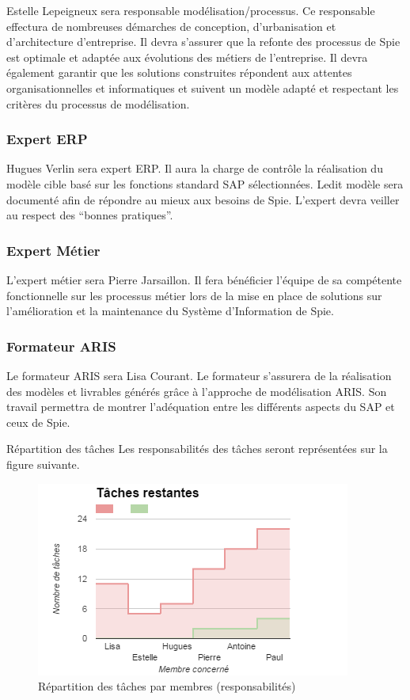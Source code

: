 Estelle Lepeigneux sera responsable modélisation/processus. Ce responsable effectura de nombreuses démarches de conception, d’urbanisation et d’architecture d’entreprise. Il devra s’assurer que la refonte des processus de Spie est optimale et adaptée aux évolutions des métiers de l’entreprise. Il devra également garantir que les solutions construites répondent aux attentes organisationnelles et informatiques et suivent un modèle adapté et respectant les critères du processus de modélisation.

\subsubsection{Expert ERP}

Hugues Verlin sera expert ERP. Il aura la charge de contrôle la réalisation du modèle cible basé sur les fonctions standard SAP sélectionnées. Ledit modèle sera documenté afin de répondre au mieux aux besoins de Spie. L’expert devra veiller au respect des “bonnes pratiques”.

\subsubsection{Expert Métier}

L’expert métier sera Pierre Jarsaillon. Il fera bénéficier l’équipe de sa compétente fonctionnelle sur les processus métier lors de la mise en place de solutions sur l’amélioration et la maintenance du Système d’Information de Spie.

\subsubsection{Formateur ARIS}

Le formateur ARIS sera Lisa Courant. Le formateur s’assurera de la réalisation des modèles et livrables générés grâce à l’approche de modélisation ARIS. Son travail permettra de montrer l'adéquation entre les différents aspects du SAP et ceux de Spie.

Répartition des tâches
    Les responsabilités des tâches seront représentées sur la figure suivante.
    
\begin{figure}[H]
    \centering
    \label{fig-taches}
    \includegraphics[scale=0.6]{figures/taches_restantes.png}
    \caption{Répartition des tâches par membres (responsabilités)}
\end{figure}

